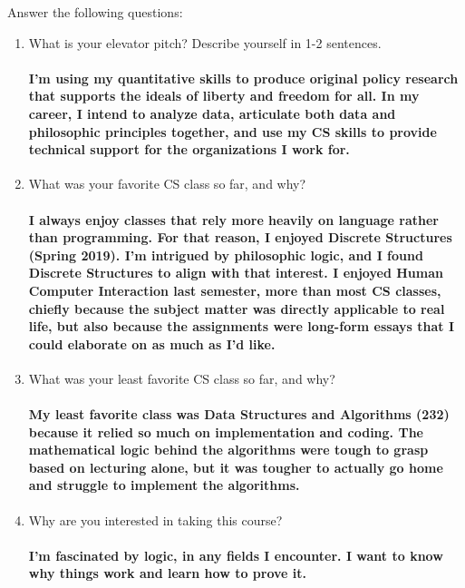 \documentclass{article}
\begin{document}
Answer the following questions:
\begin{enumerate}
    \item What is your elevator pitch?  Describe yourself in 1-2
                sentences.

        \paragraph{I'm using my quantitative skills to produce original policy research that supports the ideals of liberty and freedom for all. In my career, I intend to analyze data, articulate both data and philosophic principles together, and use my CS skills to provide technical support for the organizations I work for.}

     \item What was your favorite CS class so far, and why?

         \paragraph{I always enjoy classes that rely more heavily on language rather than programming. For that reason, I enjoyed Discrete Structures (Spring 2019). I'm intrigued by philosophic logic, and I found Discrete Structures to align with that interest. I enjoyed Human Computer Interaction last semester, more than most CS classes, chiefly because the subject matter was directly applicable to real life, but also because the assignments were long-form essays that I could elaborate on as much as I'd like.} \todo{}

     \item What was your least favorite CS class so far, and why?

         \paragraph{My least favorite class was Data Structures and Algorithms (232) because it relied so much on implementation and coding. The mathematical logic behind the algorithms were tough to grasp based on lecturing alone, but it was tougher to actually go home and struggle to implement the algorithms.} \todo{}

     \item Why are you interested in taking this course?

         \paragraph{I'm fascinated by logic, in any fields I encounter. I want to know why things work and learn how to prove it.} \todo{}


\end{enumerate}
\end{document}
